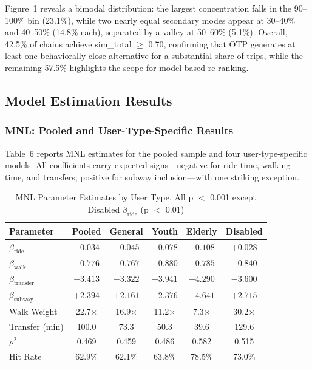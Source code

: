 Figure~1 reveals a bimodal distribution: the largest concentration falls in
the 90--100\% bin (23.1\%), while two nearly equal secondary modes appear at
30--40\% and 40--50\% (14.8\% each), separated by a valley at 50--60\%
(5.1\%). Overall, 42.5\% of chains achieve sim\_total $\geq$ 0.70, confirming
that OTP generates at least one behaviorally close alternative for a
substantial share of trips, while the remaining 57.5\% highlights the scope
for model-based re-ranking.

\subsection{Model Estimation Results}

\subsubsection{MNL: Pooled and User-Type-Specific Results}

Table~6 reports MNL estimates for the pooled sample and four
user-type-specific models. All coefficients carry expected signs---negative
for ride time, walking time, and transfers; positive for subway
inclusion---with one striking exception.

\begin{table}[htbp]
\centering
\tablefont
\begin{tabular}{|l|c|c|c|c|c|}
\hline
\headrow
\textbf{Parameter} & \textbf{Pooled} & \textbf{General} & \textbf{Youth} &
\textbf{Elderly} & \textbf{Disabled} \\
\hline
$\beta_{\mathrm{ride}}$     & $-0.034$ & $-0.045$ & $-0.078$ & $+0.108$ & $+0.028$ \\
\hline
$\beta_{\mathrm{walk}}$     & $-0.776$ & $-0.767$ & $-0.880$ & $-0.785$ & $-0.840$ \\
\hline
$\beta_{\mathrm{transfer}}$ & $-3.413$ & $-3.322$ & $-3.941$ & $-4.290$ & $-3.600$ \\
\hline
$\beta_{\mathrm{subway}}$   & $+2.394$ & $+2.161$ & $+2.376$ & $+4.641$ & $+2.715$ \\
\hline
Walk Weight    & 22.7$\times$ & 16.9$\times$ & 11.2$\times$ & 7.3$\times$ & 30.2$\times$ \\
\hline
Transfer (min) & 100.0 & 73.3 & 50.3 & 39.6 & 129.6 \\
\hline
$\rho^2$       & 0.469 & 0.459 & 0.486 & 0.582 & 0.515 \\
\hline
Hit Rate       & 62.9\% & 62.1\% & 63.8\% & 78.5\% & 73.0\% \\
\hline
\end{tabular}
\caption{MNL Parameter Estimates by User Type. All p $<$ 0.001 except
Disabled $\beta_{\mathrm{ride}}$ (p $<$ 0.01)}
\end{table}

